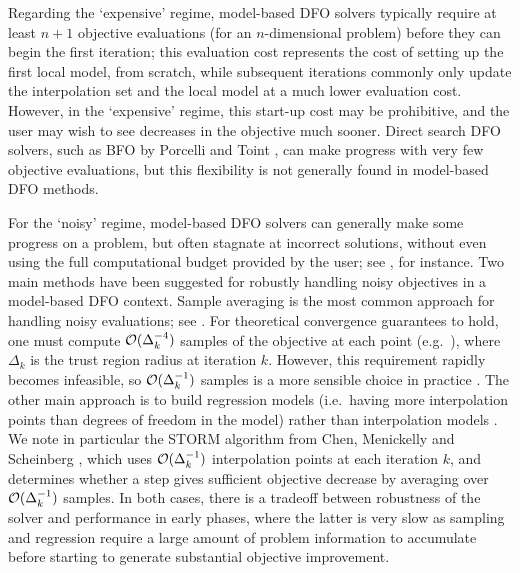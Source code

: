 Regarding the `expensive' regime, model-based DFO solvers typically require at least $n+1$ objective evaluations (for an $n$-dimensional problem)   before they can begin the first iteration;
this evaluation cost represents the cost of setting up the first local model, from scratch, while subsequent iterations commonly
only update the interpolation set and the local model at a much lower evaluation cost.
However, in the `expensive' regime, this start-up cost may be prohibitive, and the user may wish to see decreases in the objective much sooner.
Direct search DFO solvers, such as BFO by Porcelli and Toint \cite{Porcelli2017}, can make progress with very few objective evaluations, but this flexibility is not generally found in model-based DFO
methods.

For the `noisy' regime, model-based DFO solvers can generally  make some progress on a problem, but often stagnate at incorrect solutions, without even  using  the full computational budget provided by the user; see , for instance.
Two main methods have been suggested for robustly handling noisy objectives in a model-based DFO context.
Sample averaging is the most common approach for handling noisy evaluations; see  \cite{Deng2006,Deng2009,Shashaani2016,Chen2016}.
For theoretical convergence guarantees to hold, one must compute $\mathcal{O}(\Delta_k^{-4})$ samples of the objective at each point (e.g.~\cite{Chen2016}), where $\Delta_k$ is the trust region radius at iteration $k$.
However, this requirement rapidly becomes infeasible, so $\mathcal{O}(\Delta_k^{-1})$ samples is a more sensible choice in practice  \cite{Chen2016}.
The other main approach is to build regression models (i.e.~having more interpolation points than degrees of freedom in the model) rather than interpolation models \cite{Conn2008,Billups2013,Chen2016}.
We note in particular the STORM algorithm from Chen, Menickelly and Scheinberg \cite{Chen2016}, which uses $\mathcal{O}(\Delta_k^{-1})$ interpolation points at each iteration $k$, and determines whether a step gives sufficient objective decrease by averaging over $\mathcal{O}(\Delta_k^{-1})$ samples.
In both cases,  there is a tradeoff between robustness of the solver and performance in early phases, where the latter is very slow as sampling and regression require a large amount of problem information to accumulate before starting to generate substantial objective improvement. 


